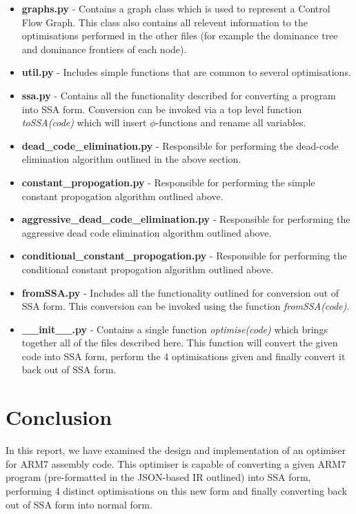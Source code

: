 \documentclass[a4paper,10pt]{report}
\begin{document}
\begin{itemize}
\item \textbf{graphs.py} - Contains a graph class which is used to represent a Control Flow Graph. This class also contains all relevent
                  information to the optimisations performed in the other files (for example the dominance tree and dominance
                  frontiers of each node).
                  
\item \textbf{util.py} - Includes simple functions that are common to several optimisations.

\item \textbf{ssa.py} - Contains all the functionality described for converting a program into SSA form. Conversion can be invoked via a
               top level function \textit{toSSA(code)} which will insert \(\phi\)-functions and rename all variables.
               
\item \textbf{dead\_code\_elimination.py} - Responsible for performing the dead-code elimination algorithm outlined in the above section.

\item \textbf{constant\_propogation.py} - Responsible for performing the simple constant propogation algorithm outlined above.

\item \textbf{aggressive\_dead\_code\_elimination.py} - Responsible for performing the aggressive dead code elimination algorithm outlined above.

\item \textbf{conditional\_constant\_propogation.py} - Responsible for performing the conditional constant propogation algorithm outlined above.

\item \textbf{fromSSA.py} - Includes all the functionality outlined for conversion out of SSA form. This conversion can be invoked using the
                   function \textit{fromSSA(code)}.

\item \textbf{\_\_init\_\_.py} - Contains a single function \textit{optimise(code)} which brings together all of the files described here. This
                    function will convert the given code into SSA form, perform the 4 optimisations given and finally convert it
                    back out of SSA form.
\end{itemize}

\chapter{Conclusion}
In this report, we have examined the design and implementation of an optimiser for ARM7 assembly code. This optimiser is capable of
converting a given ARM7 program (pre-formatted in the JSON-based IR outlined) into SSA form, performing 4 distinct optimisations on
this new form and finally converting back out of SSA form into normal form. 
\end{document}
